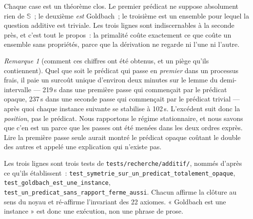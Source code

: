 \documentclass[11pt]{article}
\theoremstyle{remark}\newtheorem{remarque}{Remarque}
\begin{document}
Chaque case est un théorème clos. Le premier prédicat ne suppose absolument rien de
$\mathbb{S}$~; le deuxième \emph{est} Goldbach~; le troisième est un ensemble pour lequel
la question additive est triviale. Les trois lignes sont indiscernables à la seconde
près, et c'est tout le propos~: la primalité coûte exactement ce que coûte un ensemble
sans propriétés, parce que la dérivation ne regarde ni l'une ni l'autre.

\begin{remarque}[comment ces chiffres ont été obtenus, et un piège qu'ils contiennent]
Quel que soit le prédicat qui passe en \emph{premier} dans un processus frais, il paie un
surcoût unique d'environ deux minutes sur le lemme du demi-intervalle --- 219\,s dans une
première passe qui commençait par le prédicat opaque, 237\,s dans une seconde passe qui
commençait par le prédicat trivial --- après quoi chaque instance suivante se stabilise à
102\,s. L'excédent suit donc la \emph{position}, pas le prédicat. Nous rapportons le
régime stationnaire, et nous savons que c'en est un parce que les passes ont été menées
dans les deux ordres exprès. Lire la première passe seule aurait montré le prédicat
opaque coûtant le double des autres et appelé une explication qui n'existe pas.
\end{remarque}

Les trois lignes sont trois tests de \texttt{tests/recherche/additif/}, nommés d'après ce
qu'ils établissent~: \texttt{test\_symetrie\_sur\_un\_predicat\_totalement\_opaque},
\texttt{test\_goldbach\_est\_une\_instance},
\texttt{test\_un\_predicat\_sans\_rapport\_ferme\_aussi}. Chacun affirme la clôture au
sens du noyau et ré-affirme l'invariant des 22 axiomes. « Goldbach est une instance » est
donc une exécution, non une phrase de prose.
\end{document}
